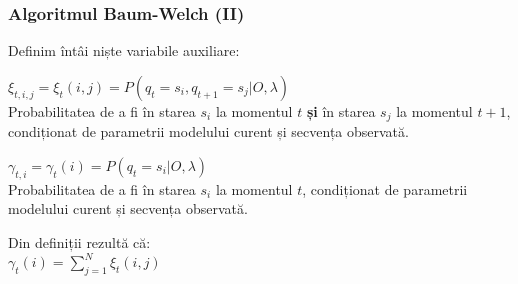 \begin{frame}[t]
	\frametitle{Algoritmul Baum-Welch (II)}
	\pause
	Definim întâi niște variabile auxiliare:
	
	\begin{block}{}    
    	$\xi_{t,i,j} = \xi_t(i,j) = P(q_t=s_i,q_{t+1}=s_j \vert O, \lambda)$\\
    	Probabilitatea de a fi în starea $s_i$ la momentul $t$ \textbf{și} în starea $s_j$ la momentul $t+1$,
    	condiționat de parametrii modelului curent și secvența observată.
	\end{block}
	\pause
	
	\begin{block}{}    
    	$ \gamma_{t,i} = \gamma_t(i) = P(q_t = s_i \vert O, \lambda)$\\
    	Probabilitatea de a fi în starea $s_i$ la momentul $t$, condiționat de parametrii modelului curent și 
    	secvența observată.
	\end{block}
	\vspace*{1em}
	\pause
	
	Din definiții rezultă că:\\
	$ \gamma_t(i) = \displaystyle\sum_{j=1}^{N}\xi_t(i,j)$
  	
\end{frame}

